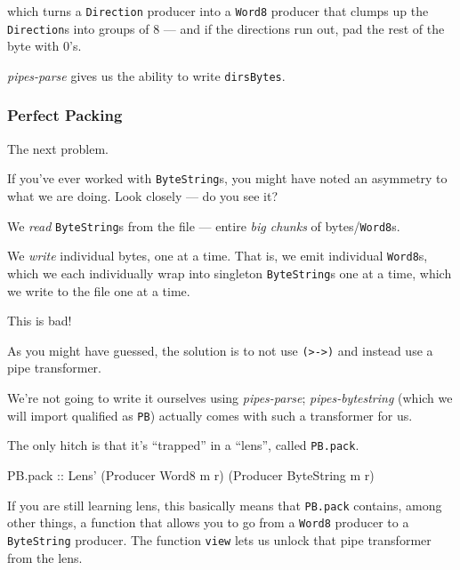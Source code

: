 \documentclass[]{article}
\newenvironment{Shaded}{}{}
\newcommand{\DataTypeTok}[1]{\textcolor[rgb]{0.56,0.13,0.00}{#1}}
\newcommand{\NormalTok}[1]{#1}
\newcommand{\OtherTok}[1]{\textcolor[rgb]{0.00,0.44,0.13}{#1}}
\begin{document}
which turns a \texttt{Direction} producer into a \texttt{Word8} producer that
clumps up the \texttt{Direction}s into groups of 8 --- and if the directions run
out, pad the rest of the byte with 0's.

\emph{pipes-parse} gives us the ability to write \texttt{dirsBytes}.

\hypertarget{perfect-packing}{%
\subsubsection{Perfect Packing}\label{perfect-packing}}

The next problem.

If you've ever worked with \texttt{ByteString}s, you might have noted an
asymmetry to what we are doing. Look closely --- do you see it?

We \emph{read} \texttt{ByteString}s from the file --- entire \emph{big chunks}
of bytes/\texttt{Word8}s.

We \emph{write} individual bytes, one at a time. That is, we emit individual
\texttt{Word8}s, which we each individually wrap into singleton
\texttt{ByteString}s one at a time, which we write to the file one at a time.

This is bad!

As you might have guessed, the solution is to not use
\texttt{(\textgreater{}-\textgreater{})} and instead use a pipe transformer.

We're not going to write it ourselves using \emph{pipes-parse};
\emph{pipes-bytestring} (which we will import qualified as \texttt{PB}) actually
comes with such a transformer for us.

The only hitch is that it's ``trapped'' in a ``lens'', called \texttt{PB.pack}.

\begin{Shaded}
\begin{Highlighting}[]
\NormalTok{PB.pack}\OtherTok{ ::} \DataTypeTok{Lens'}\NormalTok{ (}\DataTypeTok{Producer} \DataTypeTok{Word8}\NormalTok{ m r) (}\DataTypeTok{Producer} \DataTypeTok{ByteString}\NormalTok{ m r)}
\end{Highlighting}
\end{Shaded}

If you are still learning lens, this basically means that \texttt{PB.pack}
contains, among other things, a function that allows you to go from a
\texttt{Word8} producer to a \texttt{ByteString} producer. The function
\texttt{view} lets us unlock that pipe transformer from the lens.
\end{document}
